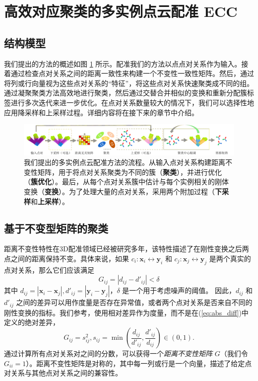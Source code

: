 \section{高效对应聚类的多实例点云配准 ECC}

\subsection{结构模型}
我们提出的方法的概述如图 \ref{fig:multicluster} 所示。配准我们的方法以点点对关系作为输入。接着通过检查点对关系之间的距离一致性来构建一个不变性一致性矩阵。然后，通过将列或行向量视为这些点对关系的“特征”，将这些点对关系快速聚类成不同的组。通过凝聚聚类方法高效地进行聚类，然后通过交替合并相似的变换和重新分配簇标签进行多次迭代来进一步优化。在点对关系数量较大的情况下，我们可以选择性地应用降采样和上采样过程。详细内容将在接下来的章节中介绍。

\begin{figure}[ht]
    \centering
    \includegraphics[width=1\textwidth]{images/multi-cluster.pdf}
    \caption{我们提出的多实例点云配准方法的流程。从输入点对关系构建距离不变性矩阵，用于将点对关系聚类为不同的簇（\textbf{聚类}），并进行优化（\textbf{簇优化}）。最后，从每个点对关系簇中估计与每个实例相关的刚体变换（\textbf{变换}）。为了处理大量的点对关系，采用两个附加过程（\textbf{下采样}和\textbf{上采样}）。}
    \label{fig:multicluster}
    \vspace{-0.6in}
\end{figure}

\subsection{基于不变型矩阵的聚类}
\label{subsec:Distance-Consistency-Graph}
距离不变性特性在3D配准领域已经被研究多年\cite{yang2020teaser, shi2021robin,leordeanu2005spectral}，该特性描述了在刚性变换之后两点之间的距离保持不变。具体来说，如果 $c_i :\boldsymbol{x}_i \leftrightarrow \boldsymbol{y}_i$ 和 $c_j : \boldsymbol{x}_j \leftrightarrow \boldsymbol{y}_j$ 是两个真实的点对关系，那么它们应该满足
%
\begin{equation}
G_{ij}=|d_{ij} - d'_{ij} | < \delta
\label{eq:abs_diff}
\end{equation}
其中 $d_{ij} = |\boldsymbol{x}_i-\boldsymbol{x}_j|, d'_{ij}=|\boldsymbol{y}_i -\boldsymbol{y}_j|$，$\delta $ 是一个用于考虑噪声的阈值。
因此，$d_{ij}$ 和 $d'_{ij}$ 之间的差异可以用作度量是否存在异常值，或者两个点对关系是否来自不同的刚性变换的指标。我们参考\cite{matrix}，使用相对差异作为度量，而不是在(\ref{eq:abs_diff})中定义的绝对差异，
\begin{equation}
G_{ij} = s_{ij}^2, s_{ij} = \min( \frac{d_{ij}}{d'_{ij}}, \frac{d'_{ij}}{d_{ij}}) \in (0, 1).
\end{equation}
通过计算所有点对关系对之间的分数，可以获得一个\emph{距离不变性矩阵} $G$（我们令 $G_{ii} = 1$）。距离不变性矩阵是对称的，其中每一列或行是一个向量，描述了给定点对关系与其他点对关系之间的兼容性\cite{reviewof3dourlierremovingjiaqiYang}。

